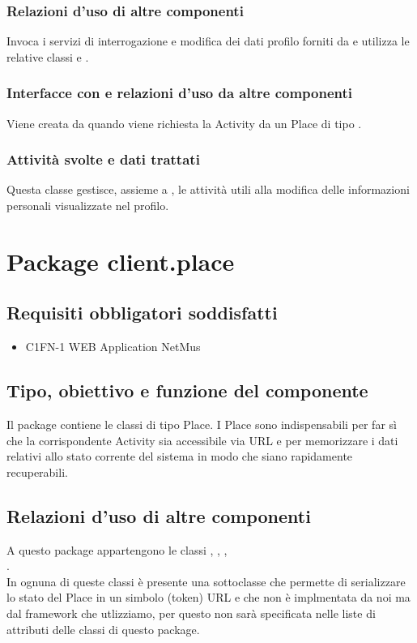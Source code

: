 \subsubsection*{Relazioni d'uso di altre componenti}
Invoca i servizi di interrogazione e modifica dei dati profilo forniti da
 e utilizza le relative classi  e
.
\subsubsection*{Interfacce con e relazioni d'uso da altre componenti}
Viene creata da  quando viene richiesta la Activity da
un Place di tipo .
\subsubsection*{Attivit\`a svolte e dati trattati}
Questa classe gestisce, assieme a , le attivit\`a utili alla
modifica delle informazioni personali visualizzate nel profilo.

\newpage
\section{Package client.place} %
\subsection*{Requisiti obbligatori soddisfatti}
\begin{itemize}
	\item C1FN-1 WEB Application NetMus
\end{itemize}
\subsection*{Tipo, obiettivo e funzione del componente}
Il package contiene le classi di tipo Place. I Place sono indispensabili
per far s\`i che la corrispondente Activity sia accessibile via URL e per
memorizzare i dati relativi allo stato corrente del sistema in modo che siano
rapidamente recuperabili. 
\subsection*{Relazioni d'uso di altre componenti} A
questo package appartengono le classi , ,
, \\.\\
In ognuna di queste classi \`e presente una sottoclasse  che
permette di serializzare lo stato del Place in un simbolo (token) URL e che non
\`e implmentata da noi ma dal framework che utlizziamo, per questo non sar\`a
specificata nelle liste di attributi delle classi di questo package.
